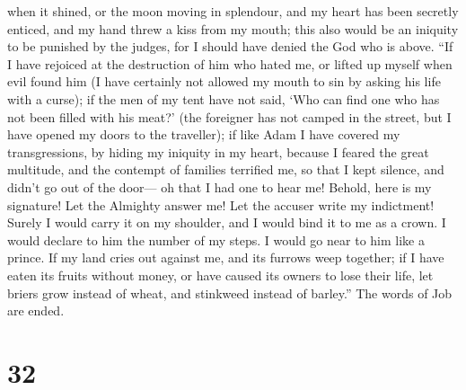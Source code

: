 when it shined, or the moon moving in splendour,  and my
heart has been secretly enticed, and my hand threw a kiss from my mouth;
 this also would be an iniquity to be punished by the
judges, for I should have denied the God who is above. 
``If I have rejoiced at the destruction of him who hated me, or lifted
up myself when evil found him  (I have certainly not
allowed my mouth to sin by asking his life with a curse);
 if the men of my tent have not said, `Who can find one
who has not been filled with his meat?'  (the foreigner
has not camped in the street, but I have opened my doors to the
traveller);  if like Adam I have covered my
transgressions, by hiding my iniquity in my heart, 
because I feared the great multitude, and the contempt of families
terrified me, so that I kept silence, and didn't go out of the door---
 oh that I had one to hear me! Behold, here is my
signature! Let the Almighty answer me! Let the accuser write my
indictment!  Surely I would carry it on my shoulder, and
I would bind it to me as a crown.  I would declare to him
the number of my steps. I would go near to him like a prince.
 If my land cries out against me, and its furrows weep
together;  if I have eaten its fruits without money, or
have caused its owners to lose their life,  let briers
grow instead of wheat, and stinkweed instead of barley.'' The words of
Job are ended.

\hypertarget{section-22}{%
\section{32}\label{section-22}}

